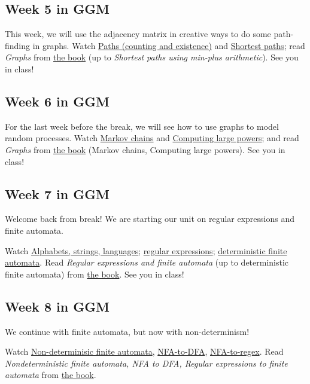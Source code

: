 \documentclass{amsart}
\begin{document}
\subsection{Week 5 in GGM}
\label{sec:orgf17d8ea}
This week, we will use the adjacency matrix in creative ways to do some path-finding in graphs.  Watch \href{https://canvas.anu.edu.au/files/738751/}{Paths (counting and existence)} and \href{https://canvas.anu.edu.au/files/738753/}{Shortest paths}; read \emph{Graphs} from \href{https://canvas.anu.edu.au/files/715877/}{the book} (up to \emph{Shortest paths using min-plus arithmetic}).  See you in class!
\subsection{Week 6 in GGM}
\label{sec:org92fec24}
For the last week before the break, we will see how to use graphs to model random processes. Watch \href{https://canvas.anu.edu.au/files/757565/}{Markov chains} and \href{https://canvas.anu.edu.au/files/757569/}{Computing large powers}; and read \emph{Graphs} from \href{https://canvas.anu.edu.au/files/715877/}{the book} (Markov chains, Computing large powers).  See you in class! 
\subsection{Week 7 in GGM}
\label{sec:orgee280dd}
Welcome back from break!  We are starting our unit on regular expressions and finite automata.

Watch \href{https://canvas.anu.edu.au/files/812083/}{Alphabets, strings, languages}; \href{https://canvas.anu.edu.au/files/812084/}{regular expressions}; \href{https://canvas.anu.edu.au/files/812086/}{deterministic finite automata}. Read \emph{Regular expressions and finite automata} (up to deterministic finite automata) from \href{https://canvas.anu.edu.au/files/715877/}{the book}.  See you in class!
\subsection{Week 8 in GGM}
\label{sec:org6c9fab9}
We continue with finite automata, but now with non-determinism!  

Watch \href{https://canvas.anu.edu.au/files/824324/}{Non-determinisic finite automata}, \href{https://canvas.anu.edu.au/files/824353/}{NFA-to-DFA}, \href{https://canvas.anu.edu.au/files/824365/}{NFA-to-regex}.
Read \emph{Nondeterministic finite automata, NFA to DFA, Regular expressions to finite automata} from \href{https://canvas.anu.edu.au/files/715877/}{the book}.
\end{document}
